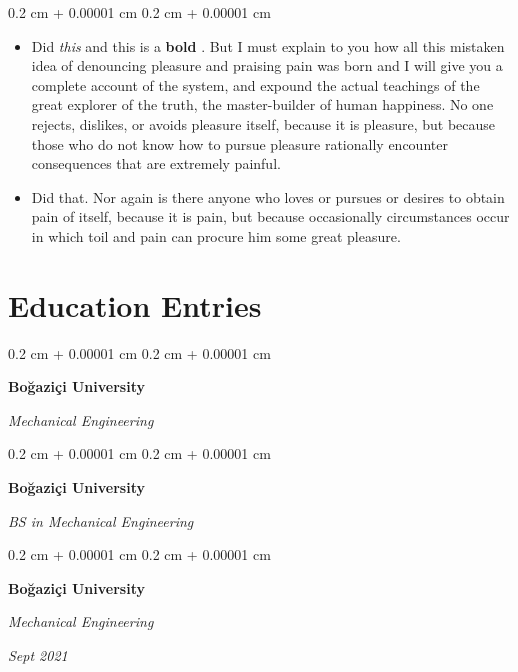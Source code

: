 \documentclass[10pt, letterpaper]{article}
\newenvironment{highlights}{
    \begin{itemize}[
        topsep=0.10 cm,
        parsep=0.10 cm,
        partopsep=0pt,
        itemsep=0pt,
        leftmargin=0.4 cm + 10pt
    ]
}{
    \end{itemize}
} %
\newenvironment{onecolentry}{
    \begin{adjustwidth}{
        0.2 cm + 0.00001 cm
    }{
        0.2 cm + 0.00001 cm
    }
}{
    \end{adjustwidth}
} %
\newenvironment{twocolentry}[2][]{
    \onecolentry
    \def\secondColumn{#2}
    \setcolumnwidth{\fill, 4.5 cm}
    \begin{paracol}{2}
}{
    \switchcolumn \raggedleft \secondColumn
    \end{paracol}
    \endonecolentry
} %
\let\hrefWithoutArrow\href
\renewcommand{\href}[2]{\hrefWithoutArrow{#1}{\ifthenelse{\equal{#2}{}}{ }{#2 }\raisebox{.15ex}{\footnotesize \faExternalLink*}}}
\begin{document}
        \vspace{0.10 cm}
        \begin{onecolentry}
            \begin{highlights}
                \item Did \textit{this} and this is a \textbf{bold} \href{https://example.com}{link}. But I must explain to you how all this mistaken idea of denouncing pleasure and praising pain was born and I will give you a complete account of the system, and expound the actual teachings of the great explorer of the truth, the master-builder of human happiness. No one rejects, dislikes, or avoids pleasure itself, because it is pleasure, but because those who do not know how to pursue pleasure rationally encounter consequences that are extremely painful.
                \item Did that. Nor again is there anyone who loves or pursues or desires to obtain pain of itself, because it is pain, but because occasionally circumstances occur in which toil and pain can procure him some great pleasure.
            \end{highlights}
        \end{onecolentry}



    
    \section{Education Entries}



        
        \begin{onecolentry}
            \textbf{Boğaziçi University}

            \textit{Mechanical Engineering}
        \end{onecolentry}



        \vspace{0.2 cm}

        \begin{onecolentry}
            \textbf{Boğaziçi University}

            \textit{BS in Mechanical Engineering}
        \end{onecolentry}



        \vspace{0.2 cm}

        \begin{twocolentry}{
            
            
        \textit{Sept 2021}}
            \textbf{Boğaziçi University}

            \textit{Mechanical Engineering}
        \end{twocolentry}
\end{document}
